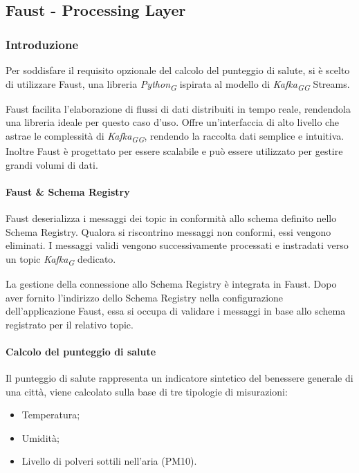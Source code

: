 \subsection{Faust - Processing Layer} \label{sec:faust}

\subsubsection{Introduzione}
Per soddisfare il requisito opzionale del calcolo del punteggio di salute, si è scelto di utilizzare Faust, una libreria \textit{Python}\textsubscript{\textit{G}} ispirata al modello di \textit{Kafka}\textsubscript{\textit{G}}\textsubscript{\textit{G}} Streams.

Faust facilita l'elaborazione di flussi di dati distribuiti in tempo reale, rendendola una libreria ideale per questo caso d'uso.
Offre un'interfaccia di alto livello che astrae le complessità di \textit{Kafka}\textsubscript{\textit{G}}\textsubscript{\textit{G}}, rendendo la raccolta dati semplice e intuitiva.
Inoltre Faust è progettato per essere scalabile e può essere utilizzato per gestire grandi volumi di dati.

\paragraph{Faust \& Schema Registry} 
Faust deserializza i messaggi dei topic in conformità allo schema definito nello Schema Registry. Qualora si riscontrino messaggi non conformi, essi vengono eliminati. I messaggi validi vengono successivamente processati e instradati verso un topic \textit{Kafka}\textsubscript{\textit{G}} dedicato.

La gestione della connessione allo Schema Registry è integrata in Faust. Dopo aver fornito l'indirizzo dello Schema Registry nella configurazione dell'applicazione Faust, essa si occupa di validare i messaggi in base allo schema registrato per il relativo topic.

\paragraph{Calcolo del punteggio di salute}
Il punteggio di salute rappresenta un indicatore sintetico del benessere generale di una città, viene calcolato sulla base di tre tipologie di misurazioni:
\begin{itemize}
    \item Temperatura;
    \item Umidità;
    \item Livello di polveri sottili nell'aria (PM10).
\end{itemize}

